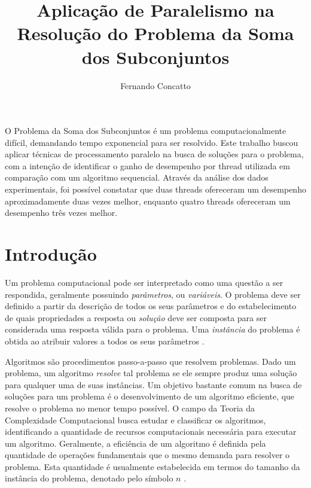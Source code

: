 \documentclass[12pt]{article}
\title{Aplicação de Paralelismo na Resolução do Problema da Soma dos Subconjuntos}
\author{Fernando Concatto\inst{1}}
\begin{document}
\maketitle

\begin{resumo}
  O Problema da Soma dos Subconjuntos é um problema computacionalmente difícil, demandando tempo exponencial para ser resolvido. Este trabalho buscou aplicar técnicas de processamento paralelo na busca de soluções para o problema, com a intenção de identificar o ganho de desempenho por thread utilizada em comparação com um algoritmo sequencial. Através da análise dos dados experimentais, foi possível constatar que duas threads ofereceram um desempenho aproximadamente duas vezes melhor, enquanto quatro threads ofereceram um desempenho três vezes melhor.
\end{resumo}


\section{Introdução} \label{sec:intro}

Um problema computacional pode ser interpretado como uma questão a ser respondida, geralmente possuindo \textit{parâmetros}, ou \textit{variáveis}. O problema deve ser definido a partir da descrição de todos os seus parâmetros e do estabelecimento de quais propriedades a resposta ou \textit{solução} deve ser composta para ser considerada uma resposta válida para o problema. Uma \textit{instância} do problema é obtida ao atribuir valores a todos os seus parâmetros \cite{Garey1979}.

Algoritmos são procedimentos passo-a-passo que resolvem problemas. Dado um problema, um algoritmo \textit{resolve} tal problema se ele sempre produz uma solução para qualquer uma de suas instâncias. Um objetivo bastante comum na busca de soluções para um problema é o desenvolvimento de um algoritmo eficiente, que resolve o problema no menor tempo possível. O campo da Teoria da Complexidade Computacional busca estudar e classificar os algoritmos, identificando a quantidade de recursos computacionais necessária para executar um algoritmo. Geralmente, a eficiência de um algoritmo é definida pela quantidade de operações fundamentais que o mesmo demanda para resolver o problema. Esta quantidade é usualmente estabelecida em termos do tamanho da instância do problema, denotado pelo símbolo $n$ \cite{Arora2009,Garey1979}.
\end{document}
